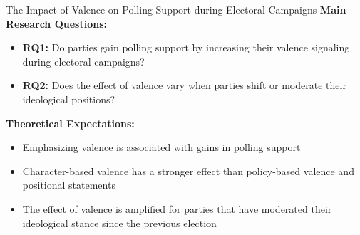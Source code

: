 \documentclass[9pt, aspectratio=169]{beamer}
\newcommand{\customcites}[1]{\textcolor{blue}{\footnotesize\parencites{#1}}}
\begin{document}
\begin{frame}{The Impact of Valence on Polling Support during Electoral Campaigns}
    \textbf{Main Research Questions:}     \vspace{0.2cm}
    \begin{itemize}
        \item \textbf{RQ1:} Do parties gain polling support by increasing their valence signaling during electoral campaigns?\vspace{0.2cm}
        \item \textbf{RQ2:} Does the effect of valence vary when parties shift or moderate their ideological positions?\vspace{0.2cm}
    \end{itemize}
\vspace{0.3cm}
    \textbf{Theoretical Expectations:} \vspace{0.2cm}
    \begin{itemize}
        \item Emphasizing valence is associated with gains in polling support \customcites{adams2011anybody, abney2013valence}\vspace{0.2cm}
        \item Character-based valence has a stronger effect than policy-based valence and positional statements \customcites{clark2009valence, Lenz2012}\vspace{0.2cm}
        \item The effect of valence is amplified for parties that have moderated their ideological stance since the previous election
    \end{itemize}
\end{frame}
\end{document}
